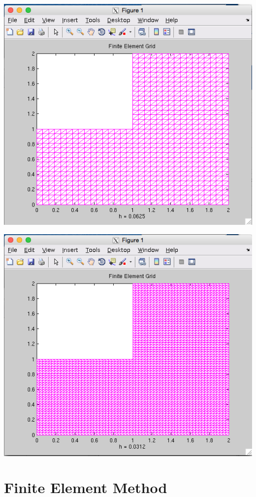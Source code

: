 \documentclass[11pt, oneside]{article}   	%
\begin{document}
\centerline{\includegraphics[scale = 0.55]{Grid_h4.png}}

\vspace{5mm}

\centerline{\includegraphics[scale = 0.55]{Grid_h5.png}}

\vspace{5mm}

\section{Finite Element Method}
\end{document}
